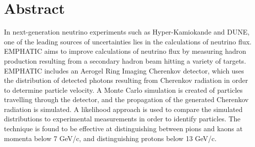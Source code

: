 
\chapter{Abstract}

In next-generation neutrino experiments such as Hyper-Kamiokande and DUNE, one of the leading sources of uncertainties lies in the calculations of neutrino flux.
 EMPHATIC aims to improve calculations of neutrino flux by measuring hadron production resulting from a secondary hadron beam hitting a variety of targets.
EMPHATIC includes an Aerogel Ring Imaging Cherenkov detector, which uses the distribution of detected photons resulting from Cherenkov radiation in order to determine particle velocity.
A Monte Carlo simulation is created of particles travelling through the detector, and the propagation of the generated Cherenkov radiation is simulated.
A likelihood approach is used to compare the simulated distributions to experimental measurements in order to identify particles.
The technique is found to be effective at distinguishing between pions and kaons at momenta below 7 GeV/c, and distinguishing protons below 13 GeV/c.

\endinput
\vfill
\begin{center}
\begin{sf}
\fbox{Revision: \today}
\end{sf}
\end{center}
